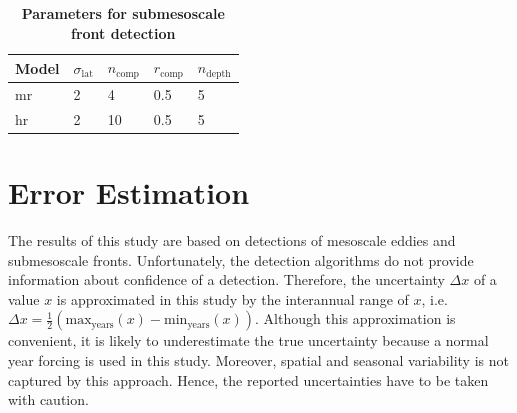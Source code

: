 \begin{table}
    \centering
    \begin{tabular}{l l l l l}
        \toprule
        \textbf{Model} &
        $\sigma_\text{lat}$ &
        $n_\text{comp}$ &
        $r_\text{comp}$ &
        $n_\text{depth}$ \\
        \midrule
        \ac{mr} & 2 & 4 & 0.5 & 5 \\
        \ac{hr} & 2 & 10 & 0.5 & 5 \\
        \bottomrule
    \end{tabular}
    \caption[Parameters for submesoscale front detection]{\textbf{Parameters for submesoscale front detection}}\label{tbl:subm-detection-parameters}
\end{table}

\section{Error Estimation}

The results of this study are based on detections of mesoscale eddies and submesoscale fronts. Unfortunately, the detection algorithms do not provide information about confidence of a detection. Therefore, the uncertainty $\Delta x$ of a value $x$ is approximated in this study by the interannual range of $x$, i.e. $\Delta x = \frac{1}{2}(\text{max}_\text{years}(x) - \text{min}_\text{years}(x))$. Although this approximation is convenient, it is likely to underestimate the true uncertainty because a normal year forcing is used in this study. Moreover, spatial and seasonal variability is not captured by this approach. Hence, the reported uncertainties have to be taken with caution.